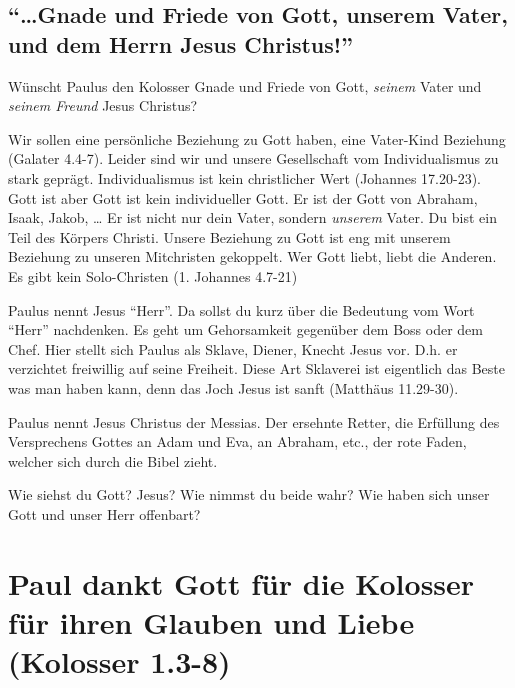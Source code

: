 \documentclass[
  12pt,
]{krantz}
\makeatletter
\newenvironment{kframe}{%
\medskip{}
\setlength{\fboxsep}{.8em}
 \def\at@end@of@kframe{}%
 \ifinner\ifhmode%
  \def\at@end@of@kframe{\end{minipage}}%
  \begin{minipage}{\columnwidth}%
 \fi\fi%
 \def\FrameCommand##1{\hskip\@totalleftmargin \hskip-\fboxsep
 \colorbox{shadecolor}{##1}\hskip-\fboxsep
     \hskip-\linewidth \hskip-\@totalleftmargin \hskip\columnwidth}%
 \MakeFramed {\advance\hsize-\width
   \@totalleftmargin\z@ \linewidth\hsize
   \@setminipage}}%
 {\par\unskip\endMakeFramed%
 \at@end@of@kframe}
\newenvironment{rmdblock}[1]
  {
  \begin{itemize}
  \renewcommand{\labelitemi}{
    \raisebox{-.7\height}[0pt][0pt]{
      {\setkeys{Gin}{width=3em,keepaspectratio}\texttt{[image: img/\#1]}}
    }
  }
  \setlength{\fboxsep}{1em}
  \begin{kframe}
  \item
  }
  {
  \end{kframe}
  \end{itemize}
  }
\newenvironment{rmdquestion}
  {\begin{rmdblock}{question}}
  {\end{rmdblock}}
\makeatother
\begin{document}
\hypertarget{gnade-und-friede-von-gott-unserem-vater-und-dem-herrn-jesus-christus}{%
\subsection{``\ldots Gnade und Friede von Gott, unserem Vater, und dem Herrn Jesus Christus!''}\label{gnade-und-friede-von-gott-unserem-vater-und-dem-herrn-jesus-christus}}

Wünscht Paulus den Kolosser Gnade und Friede von Gott, \emph{seinem} Vater und \emph{seinem Freund} Jesus Christus?

Wir sollen eine persönliche Beziehung zu Gott haben, eine Vater-Kind Beziehung (Galater 4.4-7). Leider sind wir und unsere Gesellschaft vom Individualismus zu stark geprägt. Individualismus ist kein christlicher Wert (Johannes 17.20-23). Gott ist aber Gott ist kein individueller Gott. Er ist der Gott von Abraham, Isaak, Jakob, \ldots{} Er ist nicht nur dein Vater, sondern \emph{unserem} Vater. Du bist ein Teil des Körpers Christi. Unsere Beziehung zu Gott ist eng mit unserem Beziehung zu unseren Mitchristen gekoppelt. Wer Gott liebt, liebt die Anderen. Es gibt kein Solo-Christen (1. Johannes 4.7-21)

Paulus nennt Jesus ``Herr''. Da sollst du kurz über die Bedeutung vom Wort ``Herr'' nachdenken. Es geht um Gehorsamkeit gegenüber dem Boss oder dem Chef. Hier stellt sich Paulus als Sklave, Diener, Knecht Jesus vor. D.h. er verzichtet freiwillig auf seine Freiheit. Diese Art Sklaverei ist eigentlich das Beste was man haben kann, denn das Joch Jesus ist sanft (Matthäus 11.29-30).

Paulus nennt Jesus Christus der Messias. Der ersehnte Retter, die Erfüllung des Versprechens Gottes an Adam und Eva, an Abraham, etc., der rote Faden, welcher sich durch die Bibel zieht.

\begin{rmdquestion}
Wie siehst du Gott? Jesus? Wie nimmst du beide wahr? Wie haben sich
unser Gott und unser Herr offenbart?
\end{rmdquestion}

\hypertarget{paul-dankt-gott-fuxfcr-die-kolosser-fuxfcr-ihren-glauben-und-liebe-kolosser-1.3-8}{%
\section{Paul dankt Gott für die Kolosser für ihren Glauben und Liebe (Kolosser 1.3-8)}\label{paul-dankt-gott-fuxfcr-die-kolosser-fuxfcr-ihren-glauben-und-liebe-kolosser-1.3-8}}
\end{document}
